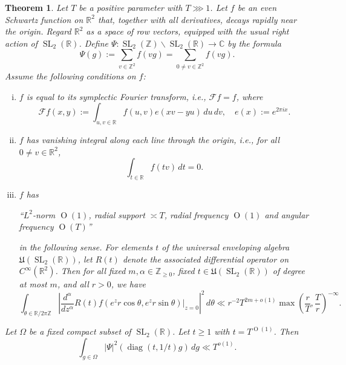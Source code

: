 \documentclass[reqno]{amsart}
\DeclareMathOperator{\SL}{SL}
\DeclareMathOperator{\diag}{diag}
\def\O{\operatorname{O}}
\theoremstyle{plain} \newtheorem{theorem} {Theorem}
\theoremstyle{definition} \newtheorem{definition} [theorem] {Definition}
\theoremstyle{itplain} %
\numberwithin{equation}{section}
\numberwithin{theorem}{section}
\renewcommand{\geq}{\geqslant}
\begin{document}
\begin{theorem}\label{thm:sub-gln:let-f-be}
  Let $T$ be a positive parameter with $T \ggg 1$.  Let $f$ be an even Schwartz function on $\mathbb{R}^2$ that, together with all derivatives, decays rapidly near the origin.  Regard $\mathbb{R}^2$ as a space of row vectors, equipped with the usual right action of $\SL_2(\mathbb{R})$.  Define $\Psi : \SL_2(\mathbb{Z}) \backslash \SL_2(\mathbb{R}) \rightarrow \mathbb{C}$ by the formula
  \begin{equation*}
    \Psi(g) :=
    \sum _{v \in \mathbb{Z}^2} f(v g)
    =
    \sum _{0 \neq v \in \mathbb{Z}^2} f(v g).
  \end{equation*}
  Assume the following conditions on $f$:
  \begin{enumerate}[(i)]
  \item \label{itm:sketch-sl2-assump-1} $f$ is equal to its symplectic Fourier transform, i.e., $\mathcal{F} f = f$, where
    \begin{equation*}
      \mathcal{F} f(x,y) := \int _{u, v \in \mathbb{R} } f(u,v ) e(x v - y u) \, d u \, d v, \quad  e(x) := e^{2 \pi i x}.
    \end{equation*}
  \item \label{itm:sketch-sl2-assump-2} $f$ has vanishing integral along each line through the origin, i.e., for all $0 \neq v \in \mathbb{R}^2$,
    \begin{equation}\label{eq:int-_t-in-1}
      \int _{t \in \mathbb{R} } f( t v) \, d t = 0.
    \end{equation}
  \item \label{itm:sketch-sl2-assump-3} $f$  has
    \begin{center}
      ``$L^2$-norm $\O(1)$, radial support $\asymp T$, radial frequency $\O(1)$ and angular frequency $\O(T)$''
    \end{center}
    in the following sense.  For elements $t$ of the universal enveloping algebra $\mathfrak{U}(\SL_2(\mathbb{R}))$, let $R(t)$ denote the associated differential operator on $C^\infty(\mathbb{R}^2)$.  Then for all fixed $m, \alpha \in \mathbb{Z}_{\geq 0}$, fixed $t \in \mathfrak{U}(\SL_2(\mathbb{R}))$ of degree at most $m$, and all $r > 0$, we have
    \begin{equation}\label{eq:int-_v-in-7}
      \int _{\theta \in \mathbb{R} / 2 \pi \mathbb{Z} }
      \left\lvert
        \frac{d^\alpha }{d z^\alpha } R(t) f(e^{z} r \cos \theta, e^z r \sin \theta )|_{z=0}
      \right\rvert^2 \, d \theta  \ll r^{-2} T^{2 m + o(1)} \max \left( \frac{r}{T}, \frac{T}{r} \right)^{-\infty}.
    \end{equation}
  \end{enumerate}
  Let $\Omega$ be a fixed compact subset of $\SL_2(\mathbb{R})$.  Let $t \geq 1$ with $t = T^{\O(1)}$.  Then
  \begin{equation}\label{eq:int-_g-in-1}
    \int _{g \in \Omega } |\Psi|^2 (\diag(t, 1/t) g) \, d g
    \ll
    T^{o(1)}.
  \end{equation}
\end{theorem}
\end{document}
